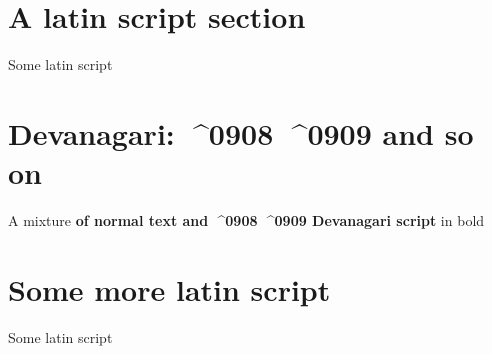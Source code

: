 \documentclass[10pt,a5paper,DIV12,BCOR8.25mm,twoside,parskip=half]{scrreprt}
\begin{document}
 \tableofcontents \section{A latin script section} Some latin script

\section{Devanagari: ^^^^0908 ^^^^0909 and so on} A mixture \textbf{ of normal text and ^^^^0908 ^^^^0909 Devanagari script} in bold
\section{Some more latin script} Some latin script
\end{document}
